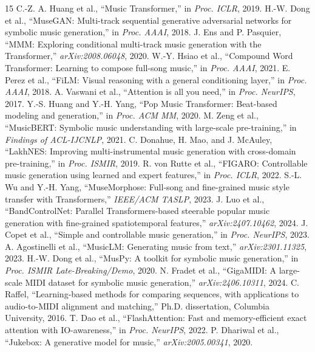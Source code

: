 \documentclass[11pt,twocolumn,a4paper]{article}
\begin{document}
\begin{thebibliography}{15}\small
{} C.-Z. A. Huang et al., ``Music Transformer,'' in \emph{Proc. ICLR}, 2019.
 H.-W. Dong et al., ``MuseGAN: Multi-track sequential generative adversarial networks for symbolic music generation,'' in \emph{Proc. AAAI}, 2018.
 J. Ens and P. Pasquier, ``MMM: Exploring conditional multi-track music generation with the Transformer,'' \emph{arXiv:2008.06048}, 2020.
 W.-Y. Hsiao et al., ``Compound Word Transformer: Learning to compose full-song music,'' in \emph{Proc. AAAI}, 2021.
 E. Perez et al., ``FiLM: Visual reasoning with a general conditioning layer,'' in \emph{Proc. AAAI}, 2018.
 A. Vaswani et al., ``Attention is all you need,'' in \emph{Proc. NeurIPS}, 2017.
 Y.-S. Huang and Y.-H. Yang, ``Pop Music Transformer: Beat-based modeling and generation,'' in \emph{Proc. ACM MM}, 2020.
 M. Zeng et al., ``MusicBERT: Symbolic music understanding with large-scale pre-training,'' in \emph{Findings of ACL-IJCNLP}, 2021.
 C. Donahue, H. Mao, and J. McAuley, ``LakhNES: Improving multi-instrumental music generation with cross-domain pre-training,'' in \emph{Proc. ISMIR}, 2019.
 R. von Rutte et al., ``FIGARO: Controllable music generation using learned and expert features,'' in \emph{Proc. ICLR}, 2022.
 S.-L. Wu and Y.-H. Yang, ``MuseMorphose: Full-song and fine-grained music style transfer with Transformers,'' \emph{IEEE/ACM TASLP}, 2023.
 J. Luo et al., ``BandControlNet: Parallel Transformers-based steerable popular music generation with fine-grained spatiotemporal features,'' \emph{arXiv:2407.10462}, 2024.
 J. Copet et al., ``Simple and controllable music generation,'' in \emph{Proc. NeurIPS}, 2023.
 A. Agostinelli et al., ``MusicLM: Generating music from text,'' \emph{arXiv:2301.11325}, 2023.
 H.-W. Dong et al., ``MusPy: A toolkit for symbolic music generation,'' in \emph{Proc. ISMIR Late-Breaking/Demo}, 2020.
 N. Fradet et al., ``GigaMIDI: A large-scale MIDI dataset for symbolic music generation,'' \emph{arXiv:2406.10311}, 2024.
 C. Raffel, ``Learning-based methods for comparing sequences, with applications to audio-to-MIDI alignment and matching,'' Ph.D. dissertation, Columbia University, 2016.
 T. Dao et al., ``FlashAttention: Fast and memory-efficient exact attention with IO-awareness,'' in \emph{Proc. NeurIPS}, 2022.
 P. Dhariwal et al., ``Jukebox: A generative model for music,'' \emph{arXiv:2005.00341}, 2020.
\end{thebibliography}
\end{document}
